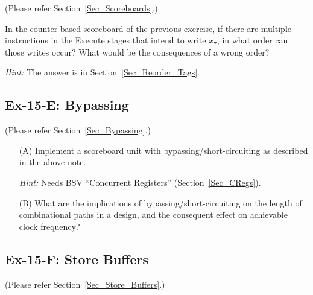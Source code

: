 (Please refer Section~\ref{Sec_Scoreboards}.)

In the counter-based scoreboard of the previous exercise, if there are
multiple instructions in the Execute stages that intend to write
$x_7$, in what order can those writes occur?  What would be the
consequences of a wrong order?

\emph{Hint:} The answer is in Section~\ref{Sec_Reorder_Tags}.


\subsection*{Ex-15-E: Bypassing}
\label{Ex-15-E-Bypassing}

(Please refer Section~\ref{Sec_Bypassing}.)

\begin{itemize}

 \item[(A)] Implement a scoreboard unit with bypassing/short-circuiting as
       described in the above note.

       \emph{Hint:} Needs BSV ``Concurrent Registers'' (Section~\ref{Sec_CRegs}).

 \item[(B)] What are the implications of bypassing/short-circuiting on the
       length of combinational paths in a design, and the consequent
       effect on achievable clock frequency?

\end{itemize}


\subsection*{Ex-15-F: Store Buffers}
\label{Ex-15-F-Store-Buffers}

(Please refer Section~\ref{Sec_Store_Buffers}.)

